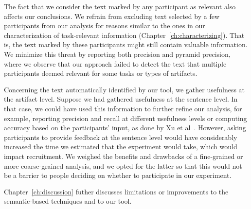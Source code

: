 The fact that we consider the text marked by any participant as relevant 
also affects our conclusions. 
We refrain from excluding text selected by a few participants from our analysis 
for reasons similar to the ones in our characterization of task-relevant information (Chapter~\ref{ch:characterizing}). That is, the text marked by these participants might still contain valuable information. 
We minimize this threat by reporting both precision and pyramid precision, where we observe that 
our approach failed to detect the text that multiple participants deemed relevant
for some tasks or types of artifacts. 



Concerning the text automatically identified by our tool, we gather usefulness at the artifact level.
Suppose we had gathered usefulness at the sentence level. In that case, we could have used this information 
to further refine our analysis, for example, reporting precision and recall 
at different usefulness levels or computing accuracy based on the participants' input, as done by Xu et al~\cite{Xu2017}. 
However, asking participants to provide feedback at the sentence level would have considerably increased the time we estimated that the experiment would take,
which would impact recruitment. We weighed the benefits and drawbacks of a fine-grained or more coarse-grained 
analysis, and we opted for the latter so that this would not be a barrier to people deciding on 
whether to participate in our experiment.


Chapter~\ref{ch:discussion} futher discusses limitations or improvements to the semantic-based techniques and to our tool.